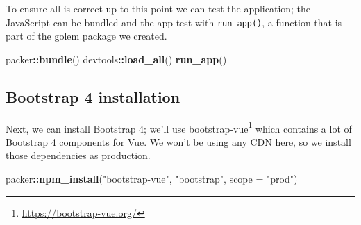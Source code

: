 \documentclass[
]{krantz}
\makeatletter
\newenvironment{Shaded}{\begin{snugshade}}{\end{snugshade}}
\newcommand{\ControlFlowTok}[1]{\textcolor[rgb]{0.27,0.27,0.27}{\textbf{#1}}}
\newcommand{\DataTypeTok}[1]{\textcolor[rgb]{0.27,0.27,0.27}{#1}}
\newcommand{\KeywordTok}[1]{\textcolor[rgb]{0.27,0.27,0.27}{\textbf{#1}}}
\newcommand{\NormalTok}[1]{#1}
\newcommand{\OperatorTok}[1]{\textcolor[rgb]{0.43,0.43,0.43}{\textbf{#1}}}
\newcommand{\StringTok}[1]{\textcolor[rgb]{0.5,0.5,0.5}{#1}}
\renewcommand{\href}[2]{#2\footnote{\url{#1}}}
\newenvironment{kframe}{%
\medskip{}
\setlength{\fboxsep}{.8em}
 \def\at@end@of@kframe{}%
 \ifinner\ifhmode%
  \def\at@end@of@kframe{\end{minipage}}%
  \begin{minipage}{\columnwidth}%
 \fi\fi%
 \def\FrameCommand##1{\hskip\@totalleftmargin \hskip-\fboxsep
 \colorbox{shadecolor}{##1}\hskip-\fboxsep
     \hskip-\linewidth \hskip-\@totalleftmargin \hskip\columnwidth}%
 \MakeFramed {\advance\hsize-\width
   \@totalleftmargin\z@ \linewidth\hsize
   \@setminipage}}%
 {\par\unskip\endMakeFramed%
 \at@end@of@kframe}
\renewenvironment{Shaded}{\begin{kframe}}{\end{kframe}}
\makeatother
\begin{document}
\begin{Shaded}
\end{Shaded}

To ensure all is correct up to this point we can test the application; the JavaScript can be bundled and the app test with \texttt{run\_app()}, a function that is part of the golem package we created.

\begin{Shaded}
\begin{Highlighting}[]
\NormalTok{packer}\OperatorTok{::}\KeywordTok{bundle}\NormalTok{()}
\NormalTok{devtools}\OperatorTok{::}\KeywordTok{load\_all}\NormalTok{()}
\KeywordTok{run\_app}\NormalTok{()}
\end{Highlighting}
\end{Shaded}

\hypertarget{packer-adv-shiny-vue-bs4}{%
\subsection{Bootstrap 4 installation}\label{packer-adv-shiny-vue-bs4}}

Next, we can install Bootstrap 4; we'll use \href{https://bootstrap-vue.org/}{bootstrap-vue} which contains a lot of Bootstrap 4 components for Vue. We won't be using any CDN here, so we install those dependencies as production.

\begin{Shaded}
\begin{Highlighting}[]
\NormalTok{packer}\OperatorTok{::}\KeywordTok{npm\_install}\NormalTok{(}\StringTok{"bootstrap{-}vue"}\NormalTok{, }\StringTok{"bootstrap"}\NormalTok{, }\DataTypeTok{scope =} \StringTok{"prod"}\NormalTok{)}
\end{Highlighting}
\end{Shaded}
\end{document}
